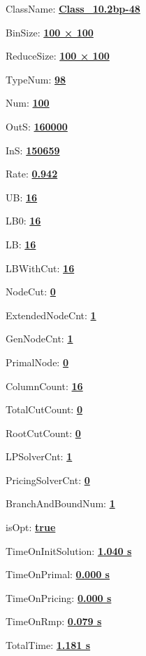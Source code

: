 \documentclass[11pt]{article}
\begin{document}
\pagestyle{empty}


ClassName: \underline{\textbf{Class_10.2bp-48}}
\par
BinSize: \underline{\textbf{100 × 100}}
\par
ReduceSize: \underline{\textbf{100 × 100}}
\par
TypeNum: \underline{\textbf{98}}
\par
Num: \underline{\textbf{100}}
\par
OutS: \underline{\textbf{160000}}
\par
InS: \underline{\textbf{150659}}
\par
Rate: \underline{\textbf{0.942}}
\par
UB: \underline{\textbf{16}}
\par
LB0: \underline{\textbf{16}}
\par
LB: \underline{\textbf{16}}
\par
LBWithCut: \underline{\textbf{16}}
\par
NodeCut: \underline{\textbf{0}}
\par
ExtendedNodeCnt: \underline{\textbf{1}}
\par
GenNodeCnt: \underline{\textbf{1}}
\par
PrimalNode: \underline{\textbf{0}}
\par
ColumnCount: \underline{\textbf{16}}
\par
TotalCutCount: \underline{\textbf{0}}
\par
RootCutCount: \underline{\textbf{0}}
\par
LPSolverCnt: \underline{\textbf{1}}
\par
PricingSolverCnt: \underline{\textbf{0}}
\par
BranchAndBoundNum: \underline{\textbf{1}}
\par
isOpt: \underline{\textbf{true}}
\par
TimeOnInitSolution: \underline{\textbf{1.040 s}}
\par
TimeOnPrimal: \underline{\textbf{0.000 s}}
\par
TimeOnPricing: \underline{\textbf{0.000 s}}
\par
TimeOnRmp: \underline{\textbf{0.079 s}}
\par
TotalTime: \underline{\textbf{1.181 s}}
\par
\newpage


\end{document}
